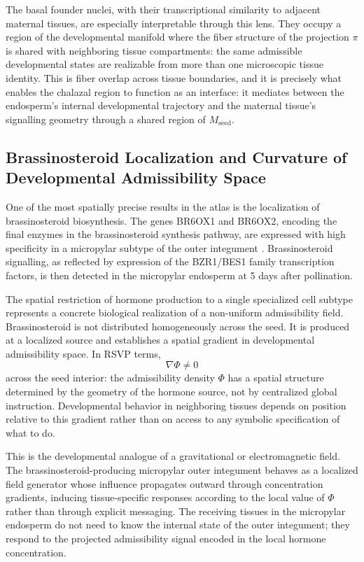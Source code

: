 \documentclass[12pt, a4paper]{article}
\theoremstyle{essaystyle}
\begin{document}
The basal founder nuclei, with their transcriptional similarity to adjacent maternal
tissues, are especially interpretable through this lens. They occupy a region of the
developmental manifold where the fiber structure of the projection $\pi$ is shared with
neighboring tissue compartments: the same admissible developmental states are
realizable from more than one microscopic tissue identity. This is fiber overlap across
tissue boundaries, and it is precisely what enables the chalazal region to function as
an interface: it mediates between the endosperm's internal developmental trajectory
and the maternal tissue's signalling geometry through a shared region of
$M_{\mathrm{seed}}$.

\subsection{Brassinosteroid Localization and Curvature of Developmental Admissibility Space}

One of the most spatially precise results in the atlas is the localization of
brassinosteroid biosynthesis. The genes BR6OX1 and BR6OX2, encoding the final enzymes
in the brassinosteroid synthesis pathway, are expressed with high specificity in a
micropylar subtype of the outer integument \citep{martin2026atlas}. Brassinosteroid
signalling, as reflected by expression of the BZR1/BES1 family transcription factors,
is then detected in the micropylar endosperm at 5 days after pollination.

The spatial restriction of hormone production to a single specialized cell subtype
represents a concrete biological realization of a non-uniform admissibility field.
Brassinosteroid is not distributed homogeneously across the seed. It is produced
at a localized source and establishes a spatial gradient in developmental admissibility
space. In RSVP terms,
\[
\nabla \Phi \neq 0
\]
across the seed interior: the admissibility density $\Phi$ has a spatial structure
determined by the geometry of the hormone source, not by centralized global instruction.
Developmental behavior in neighboring tissues depends on position relative to this
gradient rather than on access to any symbolic specification of what to do.

This is the developmental analogue of a gravitational or electromagnetic field. The
brassinosteroid-producing micropylar outer integument behaves as a localized field
generator whose influence propagates outward through concentration gradients, inducing
tissue-specific responses according to the local value of $\Phi$ rather than through
explicit messaging. The receiving tissues in the micropylar endosperm do not need to
know the internal state of the outer integument; they respond to the projected
admissibility signal encoded in the local hormone concentration.
\end{document}
